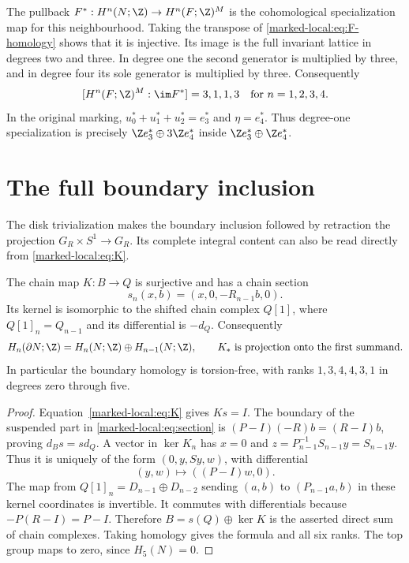 The pullback $F^*:H^n(N;\Z)\to H^n(F;\Z)^M$ is the
cohomological specialization map for this neighbourhood.
Taking the transpose of \eqref{marked-local:eq:F-homology} shows that it is
injective. Its image is the
full invariant lattice in degrees two and three. In degree one the
second generator is multiplied by three, and in degree four its sole
generator is multiplied by three. Consequently
\begin{equation}\label{marked-local:eq:specialization-indices}
 [H^n(F;\Z)^M:\im F^*]=3,1,1,3
                         \quad\text{for }n=1,2,3,4.
\end{equation}
In the original marking,
$u_0^*+u_1^*+u_2^*=e_3^*$ and $\eta=e_4^*$.
Thus degree-one specialization is precisely
$\Z e_3^*\oplus3\Z e_4^*$ inside
$\Z e_3^*\oplus\Z e_4^*$.

\section{The full boundary inclusion}

The disk trivialization makes the boundary inclusion followed by
retraction the projection $G_R\times S^1\to G_R$.
Its complete integral content can also be read directly from
\eqref{marked-local:eq:K}.

\begin{proposition}\label{marked-local:prop:boundary-splitting}
The chain map $K:B\to Q$ is surjective and has a chain section
\begin{equation}\label{marked-local:eq:section}
 s_n(x,b)=(x,0,-R_{n-1}b,0).
\end{equation}
Its kernel is isomorphic to the shifted chain complex $Q[1]$, where
$Q[1]_n=Q_{n-1}$ and its differential is $-d_Q$.
Consequently
\[
 H_n(\partial N;\Z)=H_n(N;\Z)\oplus H_{n-1}(N;\Z),
 \qquad K_*\text{ is projection onto the first summand}.
\]
In particular the boundary homology is torsion-free, with ranks
$1,3,4,4,3,1$ in degrees zero through five.
\end{proposition}
\begin{proof}
Equation~\eqref{marked-local:eq:K} gives $Ks=I$. The boundary of the suspended
part in \eqref{marked-local:eq:section} is
$(P-I)(-R)b=(R-I)b$, proving $d_Bs=sd_Q$.
A vector in $\ker K_n$ has $x=0$ and
$z=P_{n-1}^{-1}S_{n-1}y=S_{n-1}y$. Thus it is uniquely of the
form $(0,y,Sy,w)$, with differential
\[
                    (y,w)\longmapsto((P-I)w,0).
\]
The map from $Q[1]_n=D_{n-1}\oplus D_{n-2}$ sending
$(a,b)$ to $(P_{n-1}a,b)$ in these kernel coordinates is invertible.
It commutes with differentials because $-P(R-I)=P-I$.
Therefore $B=s(Q)\oplus\ker K$ is the asserted direct sum of
chain complexes. Taking homology gives the formula and all six ranks.
The top group maps to zero, since $H_5(N)=0$.
\end{proof}

